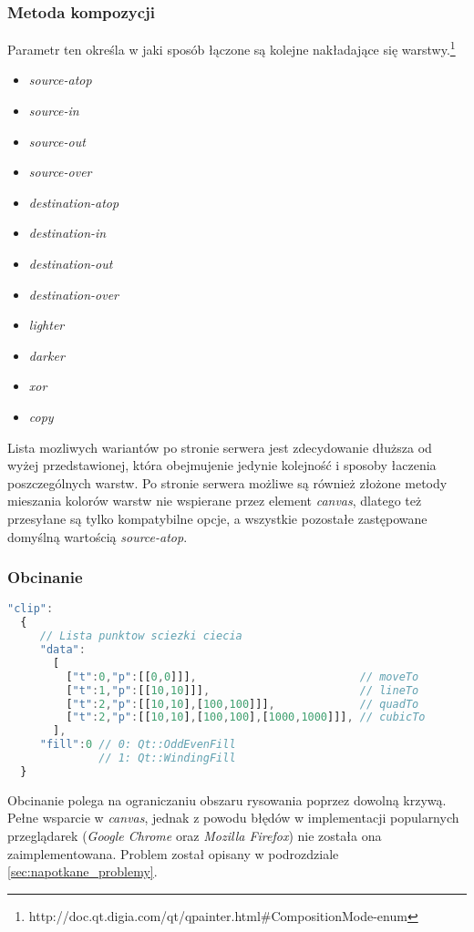 \subsubsection{Metoda kompozycji}
Parametr ten określa w jaki sposób łączone są kolejne nakładające się warstwy.\footnote{http://doc.qt.digia.com/qt/qpainter.html\#CompositionMode-enum}
\begin{itemize}
\item \emph{source-atop}
\item \emph{source-in}
\item \emph{source-out}
\item \emph{source-over}
\item \emph{destination-atop}
\item \emph{destination-in}
\item \emph{destination-out}
\item \emph{destination-over}
\item \emph{lighter}
\item \emph{darker}
\item \emph{xor}
\item \emph{copy}
\end{itemize}

Lista mozliwych wariantów po stronie serwera jest zdecydowanie dłuższa od wyżej przedstawionej, która obejmujenie jedynie kolejność i sposoby łaczenia poszczególnych warstw. Po stronie serwera możliwe są również złożone metody mieszania kolorów warstw nie wspierane przez element \emph{canvas}, dlatego też przesyłane są tylko kompatybilne opcje, a wszystkie pozostałe zastępowane domyślną wartością \emph{source-atop}.

\subsubsection{Obcinanie}
\begin{lstlisting}[language=JavaScript,numbers=none]
"clip":
  {
     // Lista punktow sciezki ciecia
     "data":			
       [
         ["t":0,"p":[[0,0]]],                         // moveTo
         ["t":1,"p":[[10,10]]],                       // lineTo
         ["t":2,"p":[[10,10],[100,100]]],             // quadTo
         ["t":2,"p":[[10,10],[100,100],[1000,1000]]], // cubicTo
       ],
     "fill":0 // 0: Qt::OddEvenFill
              // 1: Qt::WindingFill
  }
\end{lstlisting}
Obcinanie polega na ograniczaniu obszaru rysowania poprzez dowolną krzywą. 
Pełne wsparcie w \emph{canvas}, jednak z powodu błędów w implementacji popularnych przeglądarek (\emph{Google Chrome} oraz \emph{Mozilla Firefox}) nie została ona zaimplementowana. Problem został opisany w podrozdziale \ref{sec:napotkane_problemy}.